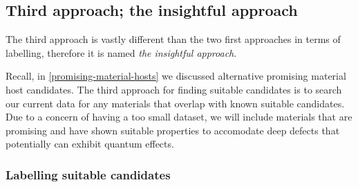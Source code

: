 \begin{table}[!ht]
\centering
\caption{A table showing the number of entries through the data mining process for suitable candidates in approach $2$ and unsuitable candidates in approach $1$ and $2$.}
\label{tab:suitable-unsuitable-candidates}
\noindent{}
\end{table}

\subsection{Third approach; the insightful approach}

The third approach is vastly different than the two first approaches in terms of labelling, therefore it is named \textit{the insightful approach}.

Recall, in \autoref{promising-material-hosts} we discussed alternative promising material host candidates. The third approach for finding suitable candidates is to search our current data for any materials that overlap with known suitable candidates. Due to a concern of having a too small dataset, we will include materials that are promising and have shown suitable properties to accomodate deep defects that potentially can exhibit quantum effects.


\subsubsection{Labelling suitable candidates}

